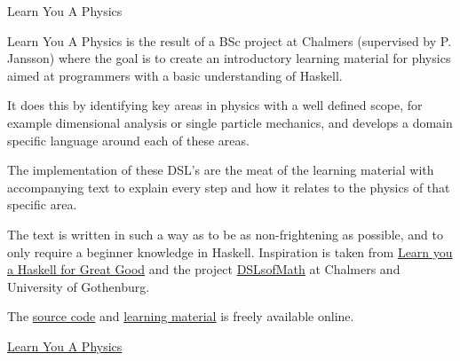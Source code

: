 \documentclass[DIV16,twocolumn,10pt]{scrreprt}
\begin{document}
\begin{hcarentry}{Learn You A Physics}
\makeheader

Learn You A Physics is the result of a BSc project at Chalmers (supervised by P. Jansson) where the
goal is to create an introductory learning material for physics aimed at programmers
with a basic understanding of Haskell.

It does this by identifying key areas in physics with a well defined scope,
for example dimensional analysis or single particle mechanics, and develops
a domain specific language around each of these areas.

The implementation of these DSL's are the meat of the learning material with
accompanying text to explain every step and how it relates to the physics of
that specific area.

The text is written in such a way as to be as non-frightening as possible,
and to only require a beginner knowledge in Haskell.
%
Inspiration is taken from \href{http://learnyouahaskell.com/}{Learn you a Haskell for Great Good} and the project \href{https://github.com/DSLsofMath/DSLsofMath}{DSLsofMath} at Chalmers and University of Gothenburg.

The \href{https://github.com/DSLsofMath/BScProj2018/tree/master/Physics}{source
code} and \href{https://dslsofmath.github.io/BScProj2018/}{learning material}
is freely available online.

\FurtherReading
  \href{https://dslsofmath.github.io/BScProj2018/} {Learn You A Physics}
\end{hcarentry}
\end{document}
